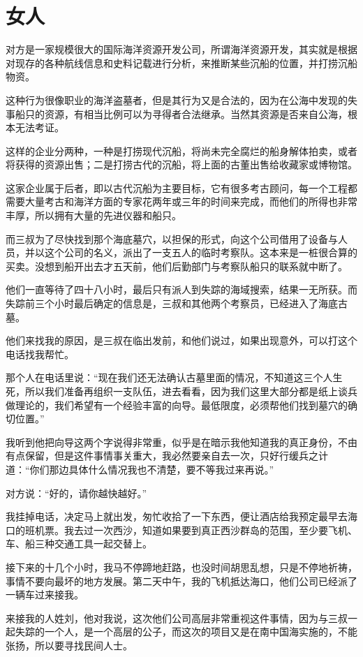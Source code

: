 \chapter{女人}

对方是一家规模很大的国际海洋资源开发公司，所谓海洋资源开发，其实就是根据对现存的各种航线信息和史料记载进行分析，来推断某些沉船的位置，并打捞沉船物资。

这种行为很像职业的海洋盗墓者，但是其行为又是合法的，因为在公海中发现的失事船只的资源，有相当比例可以为寻得者合法继承。当然其资源是否来自公海，根本无法考证。

这样的企业分两种，一种是打捞现代沉船，将尚未完全腐烂的船身解体拍卖，或者将获得的资源出售；二是打捞古代的沉船，将上面的古董出售给收藏家或博物馆。

这家企业属于后者，即以古代沉船为主要目标，它有很多考古顾问，每一个工程都需要大量考古和海洋方面的专家花两年或三年的时间来完成，而他们的所得也非常丰厚，所以拥有大量的先进仪器和船只。

而三叔为了尽快找到那个海底墓穴，以担保的形式，向这个公司借用了设备与人员，并以这个公司的名义，派出了一支五人的临时考察队。这本来是一桩很合算的买卖。没想到船开出去才五天前，他们后勤部门与考察队船只的联系就中断了。

他们一直等待了四十八小时，最后只有派人到失踪的海域搜索，结果一无所获。而失踪前三个小时最后确定的信息是，三叔和其他两个考察员，已经进入了海底古墓。

他们来找我的原因，是三叔在临出发前，和他们说过，如果出现意外，可以打这个电话找我帮忙。

那个人在电话里说：“现在我们还无法确认古墓里面的情况，不知道这三个人生死，所以我们准备再组织一支队伍，进去看看，因为我们这里大部分都是纸上谈兵做理论的，我们希望有一个经验丰富的向导。最低限度，必须帮他们找到墓穴的确切位置。”

我听到他把向导这两个字说得非常重，似乎是在暗示我他知道我的真正身份，不由有点保留，但是这件事情事关重大，我必然要亲自去一次，只好行缓兵之计道：“你们那边具体什么情况我也不清楚，要不等我过来再说。”

对方说：“好的，请你越快越好。”

我挂掉电话，决定马上就出发，匆忙收拾了一下东西，便让酒店给我预定最早去海口的班机票。我去过一次西沙，知道如果要到真正西沙群岛的范围，至少要飞机、车、船三种交通工具一起交替上。

接下来的十几个小时，我马不停蹄地赶路，也没时间胡思乱想，只是不停地祈祷，事情不要向最坏的地方发展。第二天中午，我的飞机抵达海口，他们公司已经派了一辆车过来接我。

来接我的人姓刘，他对我说，这次他们公司高层非常重视这件事情，因为与三叔一起失踪的一个人，是一个高层的公子，而这次的项目又是在南中国海实施的，不能张扬，所以要寻找民间人士。

